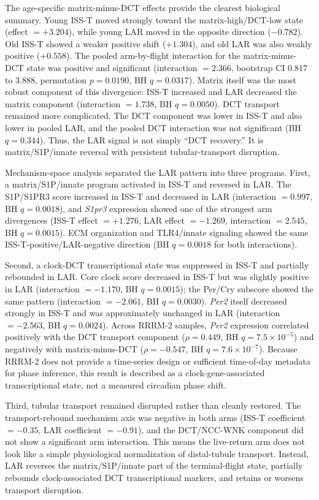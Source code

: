 \documentclass[11pt]{article}
\newcommand{\gene}[1]{\textit{#1}}
\begin{document}
The age-specific matrix-minus-DCT effects provide the clearest biological summary. Young ISS-T moved strongly toward the matrix-high/DCT-low state (effect $=+3.204$), while young LAR moved in the opposite direction ($-0.782$). Old ISS-T showed a weaker positive shift ($+1.304$), and old LAR was also weakly positive ($+0.558$). The pooled arm-by-flight interaction for the matrix-minus-DCT state was positive and significant (interaction $=2.366$, bootstrap CI $0.817$ to $3.888$, permutation $p=0.0190$, BH $q=0.0317$). Matrix itself was the most robust component of this divergence: ISS-T increased and LAR decreased the matrix component (interaction $=1.738$, BH $q=0.0050$). DCT transport remained more complicated. The DCT component was lower in ISS-T and also lower in pooled LAR, and the pooled DCT interaction was not significant (BH $q=0.344$). Thus, the LAR signal is not simply ``DCT recovery.'' It is matrix/S1P/innate reversal with persistent tubular-transport disruption.

Mechanism-space analysis separated the LAR pattern into three programs. First, a matrix/S1P/innate program activated in ISS-T and reversed in LAR. The S1P/S1PR3 score increased in ISS-T and decreased in LAR (interaction $=0.997$, BH $q=0.0018$), and \gene{S1pr3} expression showed one of the strongest arm divergences (ISS-T effect $=+1.276$, LAR effect $=-1.269$, interaction $=2.545$, BH $q=0.0015$). ECM organization and TLR4/innate signaling showed the same ISS-T-positive/LAR-negative direction (BH $q=0.0018$ for both interactions).

Second, a clock-DCT transcriptional state was suppressed in ISS-T and partially rebounded in LAR. Core clock score decreased in ISS-T but was slightly positive in LAR (interaction $=-1.170$, BH $q=0.0015$); the Per/Cry subscore showed the same pattern (interaction $=-2.061$, BH $q=0.0030$). \gene{Per2} itself decreased strongly in ISS-T and was approximately unchanged in LAR (interaction $=-2.563$, BH $q=0.0024$). Across RRRM-2 samples, \gene{Per2} expression correlated positively with the DCT transport component ($\rho=0.449$, BH $q=7.5\times10^{-5}$) and negatively with matrix-minus-DCT ($\rho=-0.547$, BH $q=7.6\times10^{-7}$). Because RRRM-2 does not provide a time-series design or sufficient time-of-day metadata for phase inference, this result is described as a clock-gene-associated transcriptional state, not a measured circadian phase shift.

Third, tubular transport remained disrupted rather than cleanly restored. The transport-rebound mechanism axis was negative in both arms (ISS-T coefficient $=-0.35$, LAR coefficient $=-0.91$), and the DCT/NCC-WNK component did not show a significant arm interaction. This means the live-return arm does not look like a simple physiological normalization of distal-tubule transport. Instead, LAR reverses the matrix/S1P/innate part of the terminal-flight state, partially rebounds clock-associated DCT transcriptional markers, and retains or worsens transport disruption.
\end{document}
